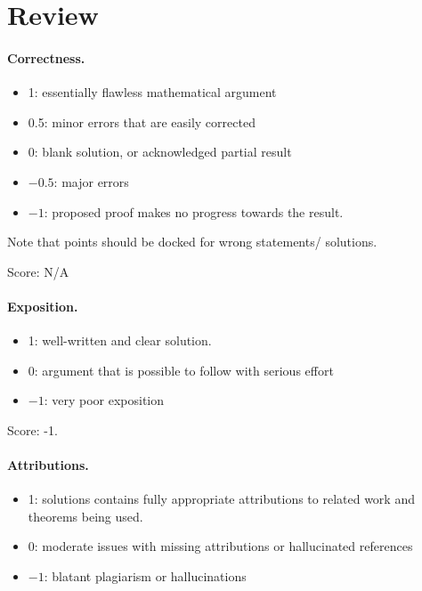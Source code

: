 \documentclass[11pt]{article}
\theoremstyle{definition}
\begin{document}
\maketitle

\section{Review}

\paragraph{Correctness.}
\begin{itemize}
	\item  1: essentially flawless mathematical argument
	\item  0.5: minor errors that are easily corrected
	\item  0: blank solution, or acknowledged partial result
	\item  $-0.5$: major errors
	\item  $-1$: proposed proof makes no progress towards the result.
\end{itemize}
Note that points should be docked for wrong statements/ solutions.

\noindent Score: N/A


\paragraph{Exposition.}
\begin{itemize}
	\item  1: well-written and clear solution.
	\item  0: argument that is possible to follow with serious effort
	\item  $-1$: very poor exposition
\end{itemize}

\noindent Score: -1.


\paragraph{Attributions.}
\begin{itemize}
	\item  1: solutions contains fully appropriate attributions
		to related work and theorems being used.
	\item  0: moderate issues with missing attributions or hallucinated references
	\item  $-1$: blatant plagiarism or hallucinations
\end{itemize}
\end{document}
